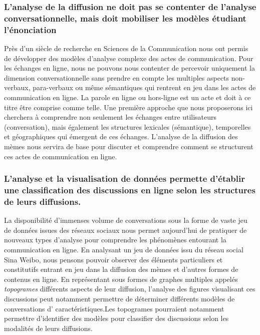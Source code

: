 \subsubsection{L'analyse de la diffusion ne doit pas se contenter de l'analyse conversationnelle, mais doit mobiliser les modèles étudiant l'énonciation} 

Près d'un siècle de recherche en Sciences de la Communication nous ont permis de développer des modèles d'analyse complexe des actes de communication. Pour les échanges en ligne, nous ne pouvons nous contenter de percevoir uniquement la dimension conversationnelle sans prendre en compte les multiples aspects non-verbaux, para-verbaux ou même sémantiques qui rentrent en jeu dans les actes de communication en ligne. La parole en ligne ou hors-ligne est un acte et doit à ce titre être comprise comme telle. Une première approche que nous proposerons ici cherchera à comprendre non seulement les échanges entre utilisateurs (conversation), mais également les structures lexicales (sémantique), temporelles et géographiques qui émergent de ces échanges. L'analyse de la diffusion des mèmes nous servira de base pour discuter et comprendre comment se structurent ces actes de communication en ligne.


\subsubsection{L'analyse et la visualisation de données permette d'établir une classification des discussions en ligne selon les structures de leurs diffusions.}

La disponibilité d'immenses volume de conversations sous la forme de vaste jeu de données issues des réseaux sociaux nous permet aujourd'hui de pratiquer de nouveaux types d'analyse pour comprendre les phénomènes entourant la communication en ligne. En analysant un jeu de données issu du réseau social Sina Weibo, nous pensons pouvoir observer des éléments particuliers et constitutifs entrant en jeu dans la diffusion des mèmes et d'autres formes de contenus en ligne. En représentant sous formes de graphes multiples appelés \textit{topogrames} différents aspects de leur diffusion, l{\textquoteright}analyse des figures visualisant ces discussions peut notamment permettre de déterminer différents modèles de conversations d{\textquoteright} caractéristiques.Les topogrames pourraient notamment permettre d'identifier des modèles pour classifier des discussions selon les modalités de leurs diffusions. 

